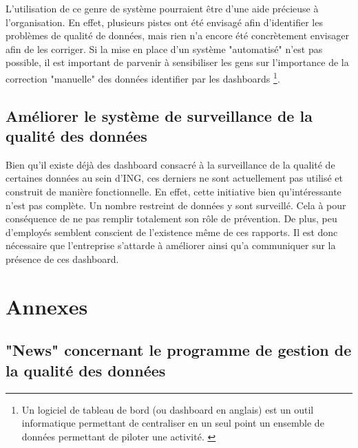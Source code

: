 \documentclass[a4paper, 12pt, french]{article}
\begin{document}
L’utilisation de ce genre de système pourraient être d’une aide précieuse à l’organisation. En effet, plusieurs pistes ont été envisagé afin d’identifier les problèmes de qualité de données, mais rien n’a encore été concrètement envisager afin de les corriger. Si la mise en place d’un système "automatisé" n’est pas possible, il est important de parvenir à sensibiliser les gens sur l’importance de la correction "manuelle" des données identifier par les dashboards \footnote{Un logiciel de tableau de bord (ou dashboard en anglais) est un outil informatique permettant de centraliser en un seul point un ensemble de données permettant de piloter une activité. \citep{Dabi-SchwebelLogicieldashboard}}.

\subsection{Améliorer le système de surveillance de la qualité des données}

Bien qu’il existe déjà des dashboard consacré à la surveillance de la qualité de certaines données au sein d’ING, ces derniers ne sont actuellement pas utilisé et construit de manière fonctionnelle. En effet, cette initiative bien qu’intéressante n’est pas complète. Un nombre restreint de données y sont surveillé. Cela à pour conséquence de ne pas remplir totalement son rôle de prévention. De plus, peu d’employés semblent conscient de l’existence même de ces rapports. Il est donc nécessaire que l'entreprise s'attarde à améliorer ainsi qu'a communiquer sur la présence de ces dashboard.

\newpage

 

\clearpage

\newpage
\section{Annexes}

\subsection{"News" concernant le programme de gestion de la qualité des données}
\end{document}
